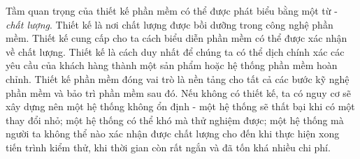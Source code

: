 \documentclass[./../SoftwareEngineering.tex]{subfiles}
\begin{document}
	
	
	Tầm quan trọng của thiết kế phần mềm có thể được phát biểu bằng một từ - \textit{chất lượng}. Thiết kế là nơi chất lượng được bồi dưỡng trong công nghệ phần mềm. Thiết kế cung cấp cho ta cách biểu diễn phần mềm có thể được xác nhận về chất lượng. Thiết kế là cách duy nhất để chúng ta có thể dịch chính xác các yêu cầu của khách hàng thành một sản phẩm hoặc hệ thống phần mềm hoàn chỉnh. Thiết kế phần mềm đóng vai trò là nền tảng cho tất cả các bước kỹ nghệ phần mềm và bảo trì phần mềm sau đó. Nếu không có thiết kế, ta có nguy cơ sẽ xây dựng nên một hệ thống không ổn định - một hệ thống sẽ thất bại khi có một thay đổi nhỏ; một hệ thống có thể khó mà thử nghiệm được; một hệ thống mà người ta không thể nào xác nhận được chất lượng cho đến khi thực hiện xong tiến trình kiểm thử, khi thời gian còn rất ngắn và đã tốn khá nhiều chi phí.
	

	
\end{document}
